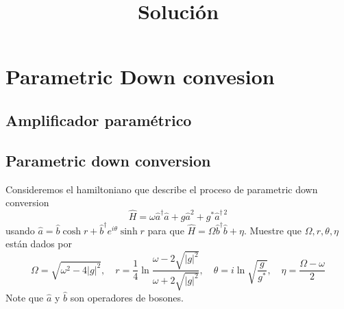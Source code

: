 \chapter{Parametric Down convesion}

\section{Amplificador paramétrico}

\section{Parametric down conversion}
Consideremos el hamiltoniano que describe el proceso de parametric down conversion
\begin{equation*}
  \hat{H} = \omega \hat{a}^{\dagger}\hat{a}  + g \hat{a}^{2} + g^{*} \hat{a}^{\dagger\,2}
\end{equation*}
usando $\hat{a} = \hat{b} \cosh{r} + \hat{b}^{\dagger} e^{i\theta} \sinh{r}$ para que $\hat{H} = \Omega \hat{b}^{\dagger}\hat{b} + \eta$. Muestre que $\Omega, r,\theta, \eta$ están dados por
\begin{equation*}
  \Omega = \sqrt{\omega^2 - 4|g|^2}, \quad r=\frac{1}{4}\ln{\frac{\omega - 2\sqrt{|g|^2}}{\omega + 2\sqrt{|g|^2}}}, \quad \theta = i\ln{\sqrt{\frac{g}{g^{*}}}}, \quad \eta = \frac{\Omega - \omega}{2}
\end{equation*}
Note que $\hat{a}$ y $\hat{b}$ son operadores de bosones.

\title{Solución}

